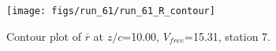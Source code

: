 \begin{figure}[H]
\centering
\texttt{[image: figs/run\_61/run\_61\_R\_contour]}
\caption{Contour plot of $\overline{r}$ at $z/c$=10.00, $V_{free}$=15.31, station 7.}
\label{fig:run_61_R_contour}
\end{figure}


